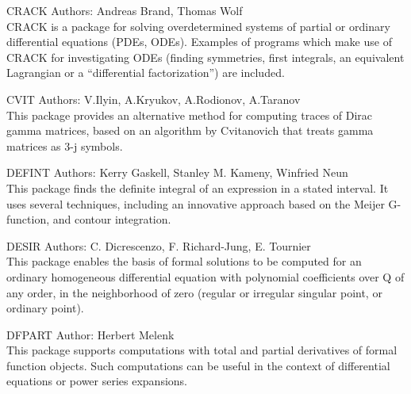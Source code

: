 \begin{Package}{CRACK}
Authors: Andreas Brand, Thomas Wolf\\

CRACK is a package for solving overdetermined systems of partial or
ordinary differential equations (PDEs, ODEs).  Examples of programs which
make use of CRACK for investigating ODEs (finding symmetries, first
integrals, an equivalent Lagrangian or a ``differential factorization'') are
included.
\end{Package}

\begin{Package}{CVIT}
Authors: V.Ilyin, A.Kryukov, A.Rodionov, A.Taranov\\

This package provides an alternative method for computing traces of Dirac
gamma matrices, based on an algorithm by Cvitanovich that treats gamma
matrices as 3-j symbols.
\end{Package}

\begin{Package}{DEFINT}
Authors: Kerry Gaskell, Stanley M. Kameny, Winfried Neun\\

This package finds the definite integral of an expression in a stated
interval.  It uses several techniques, including an innovative approach
based on the Meijer G-function, and contour integration.
\end{Package}

\begin{Package}{DESIR}
Authors: C. Dicrescenzo, F. Richard-Jung, E. Tournier\\

This package enables the basis of formal solutions to be computed for an
ordinary homogeneous differential equation with polynomial coefficients
over Q of any order, in the neighborhood of zero (regular or irregular
singular point, or ordinary point).
\end{Package}

\begin{Package}{DFPART}
Author: Herbert Melenk\\

This package supports computations with total and partial derivatives of
formal function objects.  Such computations can be useful in the context
of differential equations or power series expansions.
\end{Package}

